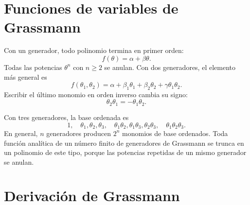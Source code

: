 \section{Funciones de variables de Grassmann}

Con un generador, todo polinomio termina en primer orden:
\begin{equation}
f(\theta)=\alpha+\beta\theta.
\end{equation}
Todas las potencias \(\theta^n\) con \(n\geq2\) se anulan. Con dos generadores, el elemento más general es
\begin{equation}
f(\theta_1,\theta_2)
=\alpha+\beta_1\theta_1+\beta_2\theta_2
+\gamma\theta_1\theta_2.
\end{equation}
Escribir el último monomio en orden inverso cambia su signo:
\begin{equation}
\theta_2\theta_1=-\theta_1\theta_2.
\end{equation}

\begin{classroomqa}
\end{classroomqa}

Con tres generadores, la base ordenada es
\begin{equation}
1,\quad
\theta_1,\theta_2,\theta_3,\quad
\theta_1\theta_2,\theta_1\theta_3,\theta_2\theta_3,\quad
\theta_1\theta_2\theta_3.
\end{equation}
En general, \(n\) generadores producen \(2^n\) monomios de base ordenados. Toda función analítica de un número finito de generadores de Grassmann se trunca en un polinomio de este tipo, porque las potencias repetidas de un mismo generador se anulan. 

\section{Derivación de Grassmann}

